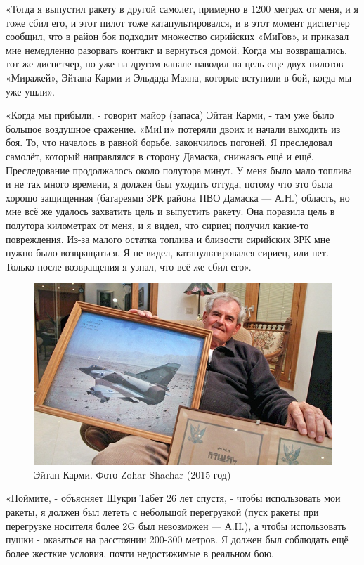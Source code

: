 «Тогда я выпустил ракету в другой самолет, примерно в 1200 метрах от меня, и я тоже сбил его, и этот пилот тоже катапультировался, и в этот момент диспетчер сообщил, что в район боя подходит множество сирийских «МиГов», и приказал мне немедленно разорвать контакт и вернуться домой. Когда мы возвращались, тот же диспетчер, но уже на другом канале наводил на цель еще двух пилотов «Миражей», Эйтана Карми и Эльдада Маяна, которые вступили в бой, когда мы уже ушли».

«Когда мы прибыли, - говорит майор (запаса) Эйтан Карми, - там уже было большое воздушное сражение. «МиГи» потеряли двоих и начали выходить из боя. То, что началось в равной борьбе, закончилось погоней. Я преследовал самолёт, который направлялся в сторону Дамаска, снижаясь ещё и ещё. Преследование продолжалось около полутора минут. У меня было мало топлива и не так много времени, я должен был уходить оттуда, потому что это была хорошо защищенная (батареями ЗРК района ПВО Дамаска — А.Н.) область, но мне всё же удалось захватить цель и выпустить ракету. Она поразила цель в полутора километрах от меня, и я видел, что сириец получил какие-то повреждения. Из-за малого остатка топлива и близости сирийских ЗРК мне нужно было возвращаться. Я не видел, катапультировался сириец, или нет. Только после возвращения я узнал, что всё же сбил его». 

\begin{figure}[h!tb] 
	\centering\includegraphics[scale=0.7]{History_Tabett/u5hPBTvBtpw.jpg}
	\caption{Эйтан Карми. Фото Zohar Shachar (2015 год)}%
\end{figure}
«Поймите, - объясняет Шукри Табет 26 лет спустя, - чтобы использовать мои ракеты, я должен был лететь с небольшой перегрузкой (пуск ракеты при перегрузке носителя более 2G был невозможен — А.Н.), а чтобы использовать пушки - оказаться на расстоянии 200-300 метров. Я должен был соблюдать ещё более жесткие условия, почти недостижимые в реальном бою.

